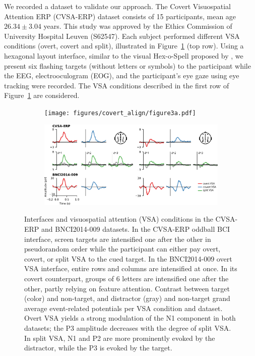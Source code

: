 We recorded a dataset to validate our approach.
The Covert Visuospatial Attention ERP (CVSA-ERP) dataset
consists of 15 participants, mean age $26.34\pm3.04$ years.
This study was approved by the Ethics Commission of University Hospital Leuven
(S62547).
Each subject performed different VSA conditions (overt, covert and split),
illustrated in Figure~\ref{fig:interface} (top row).
Using a hexagonal layout interface, similar to the visual Hex-o-Spell proposed
by \cite{Treder2010}, we present six flashing targets (without letters or
symbols) to the participant while the EEG, electrooculogram (EOG), and the
participant's eye gaze using eye tracking were recorded.
The VSA conditions described in the first row of Figure~\ref{fig:interface} are
considered.
\begin{figure}
  \bigskip
	\begin{subfigure}{\linewidth}
		\caption{}
		\label{fig:interface}
		\texttt{[image: figures/covert\_align/figure3a.pdf]}
	\end{subfigure}

	\bigskip
	\bigskip
	\begin{subfigure}{\linewidth}
		\caption{}
		\label{fig:erps}
		\includegraphics[width=\linewidth]{figures/covert_align/figure3b.pdf}
	\end{subfigure}%

  \caption[Stimulation interfaces and evoked \acsp{erp}.]{
		 Interfaces and visuospatial attention (VSA)
    conditions in the CVSA-ERP and BNCI2014-009 datasets.
		In the CVSA-ERP oddball BCI interface, screen targets are intensified one after
    the other in pseudorandom order while the participant can either pay overt,
    covert, or split VSA to the cued target.
		In the BNCI2014-009 overt VSA interface, entire rows and columns are
		intensified at once. In its covert counterpart,
		groups of 6 letters are intensified one after the other, partly relying on
    feature attention.
		 Contrast between target (color) and non-target, and
    distractor (gray) and non-target grand average event-related potentials per VSA condition and dataset.
    Overt VSA yields a strong modulation of the N1 component in both datasets;
    the P3 amplitude decreases with the degree of split VSA.
    In split VSA, N1 and P2 are more prominently evoked by the distractor,
    while the P3 is evoked by the target.
	}
\end{figure}

